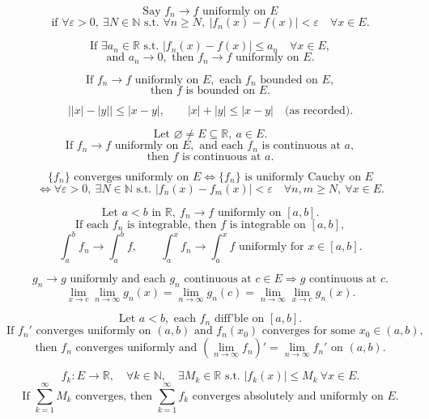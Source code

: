 \documentclass[11pt]{article}
\begin{document}
\[
\text{Say }f_n\to f\text{ uniformly on }E
\]
\[
\text{if }\forall\varepsilon>0,\ \exists N\in\mathbb N
\text{ s.t. }\forall n\ge N,\ |f_n(x)-f(x)|<\varepsilon\quad \forall x\in E.
\]

\[
\text{If }\exists a_n\in\mathbb R\text{ s.t. }|f_n(x)-f(x)|\le a_n
\quad\forall x\in E,
\]
\[
\text{and }a_n\to0,\text{ then }f_n\to f\text{ uniformly on }E.
\]

\[
\text{If }f_n\to f\text{ uniformly on }E,\text{ each }f_n\text{ bounded on }E,
\]
\[
\text{then }f\text{ is bounded on }E.
\]

\[
\big||x|-|y|\big|\le |x-y|,
\qquad
|x|+|y|\le |x-y|\quad\text{(as recorded).}
\]

\[
\text{Let }\varnothing\ne E\subseteq\mathbb R,\ a\in E.
\]
\[
\text{If }f_n\to f\text{ uniformly on }E,\text{ and each }f_n
\text{ is continuous at }a,
\]
\[
\text{then }f\text{ is continuous at }a.
\]

\[
\{f_n\}\text{ converges uniformly on }E
\Longleftrightarrow
\{f_n\}\text{ is uniformly Cauchy on }E
\]
\[
\Longleftrightarrow
\forall\varepsilon>0,\ \exists N\in\mathbb N
\text{ s.t. } |f_n(x)-f_m(x)|<\varepsilon
\quad \forall n,m\ge N,\ \forall x\in E.
\]

\[
\text{Let }a<b\text{ in }\mathbb R,\ f_n\to f\text{ uniformly on }[a,b].
\]
\[
\text{If each }f_n\text{ is integrable, then }f\text{ is integrable on }[a,b],
\]
\[
\int_a^b f_n\to\int_a^b f,
\qquad
\int_a^x f_n\to\int_a^x f
\text{ uniformly for }x\in[a,b].
\]

\[
g_n\to g\text{ uniformly and each }g_n\text{ continuous at }c\in E
\Longrightarrow g\text{ continuous at }c.
\]
\[
\lim_{x\to c}\lim_{n\to\infty}g_n(x)
=
\lim_{n\to\infty}g_n(c)
=
\lim_{n\to\infty}\lim_{x\to c}g_n(x).
\]

\[
\text{Let }a<b,\text{ each }f_n\text{ diff'ble on }[a,b].
\]
\[
\text{If }f_n'\text{ converges uniformly on }(a,b)
\text{ and }f_n(x_0)\text{ converges for some }x_0\in(a,b),
\]
\[
\text{then }f_n\text{ converges uniformly and }
\left(\lim_{n\to\infty}f_n\right)'=\lim_{n\to\infty}f_n'
\text{ on }(a,b).
\]

\[
f_k:E\to\mathbb R,\quad \forall k\in\mathbb N,\quad
\exists M_k\in\mathbb R\text{ s.t. }|f_k(x)|\le M_k\ \forall x\in E.
\]
\[
\text{If }\sum_{k=1}^{\infty}M_k\text{ converges, then }
\sum_{k=1}^{\infty}f_k\text{ converges absolutely and uniformly on }E.
\]
\end{document}

